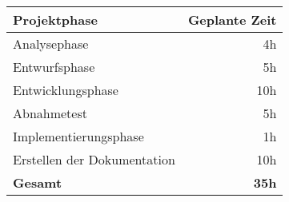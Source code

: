 \begin{tabular}{lr}
    \rowcolor{colTableLightBlue} \textcolor[rgb]{ 1,  1,  1}{\textbf{Projektphase}} & \multicolumn{1}{l}{\textcolor[rgb]{ 1,  1,  1}{\textbf{Geplante Zeit}}} \bigstrut[b]\\
    \hline
    Analysephase & 4h \bigstrut\\
    \hline
    Entwurfsphase & 5h \bigstrut\\
    \hline
    Entwicklungsphase & 10h \bigstrut\\
    \hline
    Abnahmetest & 5h \bigstrut\\
    \hline
    Implementierungsphase & 1h \bigstrut\\
    \hline
    Erstellen der Dokumentation & 10h \bigstrut\\
    \hline
    \rowcolor{colTableLightBlue} \textcolor[rgb]{ 1,  1,  1}{\textbf{Gesamt}} & \textcolor[rgb]{ 1,  1,  1}{\textbf{35h}} \bigstrut[t]\\
    \end{tabular}%
    